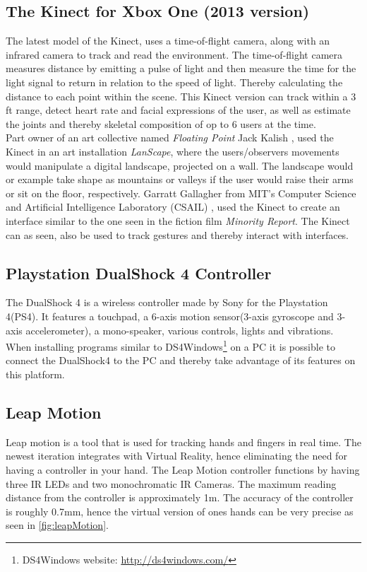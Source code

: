 \subsection{The Kinect for Xbox One (2013 version)}
The latest model of the Kinect, uses a time-of-flight camera, along with an infrared camera to track and read the environment\cite{KinectWiki}. The time-of-flight camera measures distance by emitting a pulse of light and then measure the time for the light signal to return in relation to the speed of light. Thereby calculating the distance to each point within the scene. 
This Kinect version can track within a 3 ft range, detect heart rate and facial expressions of the user, as well as estimate the joints and thereby skeletal composition of op to 6 users at the time\cite{KinectWiki}.\\
Part owner of an art collective named \textit{Floating Point} Jack Kalish \cite{LANscapes}, used the Kinect in an art installation \textit{LanScape}, where the users/observers movements would manipulate a digital landscape, projected on a wall. The landscape would or example take shape as mountains or valleys if the user would raise their arms or sit on the floor, respectively.  
Garratt Gallagher from MIT’s Computer Science and Artificial Intelligence Laboratory (CSAIL) \cite{MR_MIT}, used the Kinect to create an interface similar to the one seen in the fiction film \textit{Minority Report}. The Kinect can as seen, also be used to track gestures and thereby interact with interfaces. 


  

\subsection{Playstation DualShock 4 Controller}
The DualShock 4 is a wireless controller made by Sony for the Playstation 4(PS4). It features a touchpad, a 6-axis motion sensor(3-axis gyroscope and 3-axis accelerometer), a mono-speaker, various controls, lights and vibrations\cite{dualshock4}. When installing programs similar to DS4Windows\footnote{DS4Windows website: \url{http://ds4windows.com/}} on a PC it is possible to connect the DualShock4 to the PC and thereby take advantage of its features on this platform.

\subsection{Leap Motion} %
    Leap motion is a tool that is used for tracking hands and fingers in real time\cite{leapMotion}. The newest iteration integrates with Virtual Reality, hence eliminating the need for having a controller in your hand. The Leap Motion controller functions by having three IR LEDs and two monochromatic IR Cameras. The maximum reading distance from the controller is approximately 1m\cite{leapMotion}. The accuracy of the controller is roughly 0.7mm, hence the virtual version of ones hands can be very precise as seen in \autoref{fig:leapMotion}.
    
